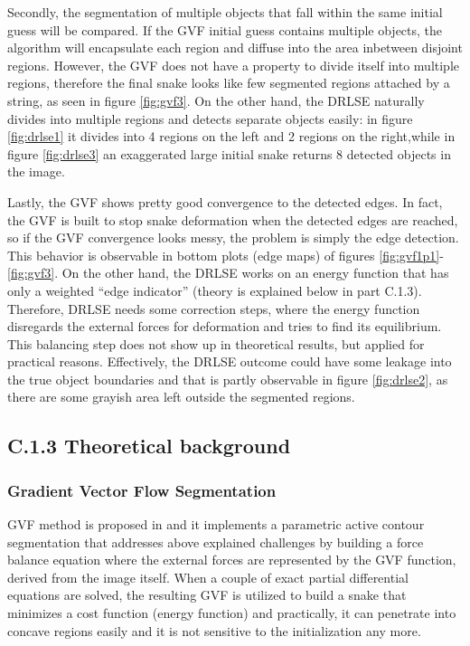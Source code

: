 \documentclass{article}
\begin{document}
Secondly, the segmentation of multiple objects that fall within the same initial guess will be compared. If the GVF initial guess contains multiple objects, the algorithm will encapsulate each region and diffuse into the area inbetween disjoint regions. However, the GVF does not have a property to divide itself into multiple regions, therefore the final snake looks like few segmented regions attached by a string, as seen in figure \ref{fig:gvf3}. On the other hand, the DRLSE naturally divides into multiple regions and detects separate objects easily: in figure \ref{fig:drlse1} it divides into 4 regions on the left and 2 regions on the right,while in figure \ref{fig:drlse3} an exaggerated large initial snake returns 8 detected objects in the image.

Lastly, the GVF shows pretty good convergence to the detected edges. In fact, the GVF is built to stop snake deformation when the detected edges are reached, so if the GVF convergence looks messy, the problem is simply the edge detection. This behavior is observable in bottom plots (edge maps) of figures \ref{fig:gvf1p1}-\ref{fig:gvf3}. On the other hand, the DRLSE works on an energy function that has only a weighted ``edge indicator'' (theory is explained below in part C.1.3). Therefore, DRLSE needs some correction steps, where the energy function disregards the external forces for deformation and tries to find its equilibrium. This balancing step does not show up in theoretical results, but applied for practical reasons. Effectively, the DRLSE outcome could have some leakage into the true object boundaries and that is partly observable in figure \ref{fig:drlse2}, as there are some grayish area left outside the segmented regions.


\subsection*{C.1.3 Theoretical background}

\subsubsection*{Gradient Vector Flow Segmentation}


GVF method is proposed in \cite{gvf} and it implements a parametric active contour segmentation that addresses above explained challenges by building a force balance equation where the external forces are represented by the GVF function, derived from the image itself. When a couple of exact partial differential equations are solved, the resulting GVF is utilized to build a snake that minimizes a cost function (energy function) and practically, it can penetrate into concave regions easily and it is not sensitive to the initialization any more. 
\end{document}
